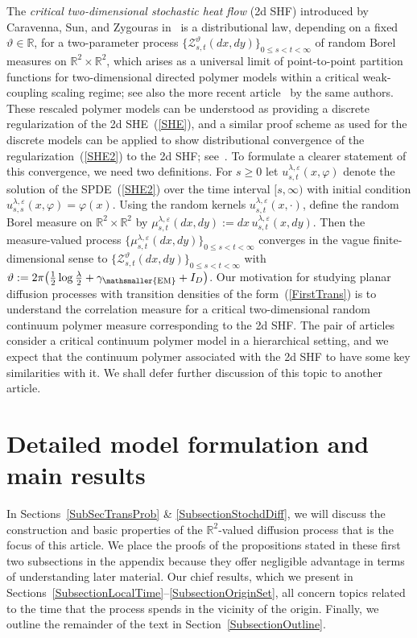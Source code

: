 \documentclass[10pt]{article}
\numberwithin{equation}{section}
\theoremstyle{definition}
\newcommand{\R}{{\mathbb R}}
\begin{document}
The \textit{critical two-dimensional stochastic heat flow} (2d SHF) introduced by Caravenna, Sun, and Zygouras in~\cite{CSZ5}  is a distributional law, depending on a fixed  $\vartheta\in \R$, for  a two-parameter   process  $\{\mathscr{Z}^{\vartheta}_{s,t}(dx,dy)\}_{0\leq s<t < \infty}$ of random Borel measures on $\R^2\times \R^2$, which arises as a universal limit of point-to-point partition functions for  two-dimensional directed polymer models within a  critical weak-coupling scaling regime; see also the more recent article~\cite{CSZ6} by the same authors.  These rescaled polymer models can be understood as providing a discrete regularization of the 2d SHE~(\ref{SHE}), and a similar proof scheme as used for the discrete models can be applied to show distributional convergence of the regularization~(\ref{SHE2}) to the 2d SHF; see~\cite[Rmk.\ 1.4]{CSZ5}.  To formulate a clearer statement of this convergence, we need two definitions.   For  $s\geq 0$ let $ u^{\lambda,\varepsilon}_{s,t}(x,\varphi)$ denote the solution of the SPDE~(\ref{SHE2}) over the time interval $[s,\infty)$ with initial condition $u^{\lambda,\varepsilon}_{s,s}(x,\varphi)=\varphi(x)$. Using the random kernels $u^{\lambda,\varepsilon}_{s,t}(x,\cdot)$, define  the random Borel measure on $\R^2\times \R^2$ by $\mu^{\lambda,\varepsilon}_{s,t}(dx,dy):=dx\, u^{\lambda,\varepsilon}_{s,t}(x,dy)$.  Then the measure-valued process $\{\mu^{\lambda, \varepsilon}_{s,t}(dx,dy)\}_{0\leq s<t < \infty}$  converges in the  vague finite-dimensional sense to
$\{\mathscr{Z}^{\vartheta}_{s,t}(dx,dy)\}_{0\leq s<t < \infty}$ with  $\vartheta:=2\pi\big( \frac{1}{2}\log\frac{\lambda}{2} +\gamma_{\mathsmaller{\textup{EM}} }+ I_D \big)$.  Our motivation for studying  planar diffusion processes  with transition densities of the form~(\ref{FirstTrans}) is to understand the correlation measure for a critical two-dimensional random continuum  polymer measure  corresponding to the 2d SHF.  The pair of articles~\cite{Clark3, Clark4} consider a   critical continuum polymer model in a hierarchical setting, and we  expect that the continuum polymer associated with the 2d SHF to have some key similarities with it. We shall defer further discussion of this topic to another article.    





\section{Detailed model formulation and main results}  \label{SecMainResults} 
In Sections~\ref{SubSecTransProb} \& \ref{SubsectionStochdDiff}, we will discuss the construction and  basic properties of the $\R^2$-valued diffusion process that is the focus of this article.  We place the proofs of the propositions stated in these first two subsections in the appendix because they  offer negligible  advantage in terms of understanding later material.   Our chief results, which we present in Sections~\ref{SubsectionLocalTime}--\ref{SubsectionOriginSet}, all concern topics related to the time that the process spends in the vicinity of the origin.  Finally, we  outline the remainder of the text  in Section~\ref{SubsectionOutline}. 
\end{document}
